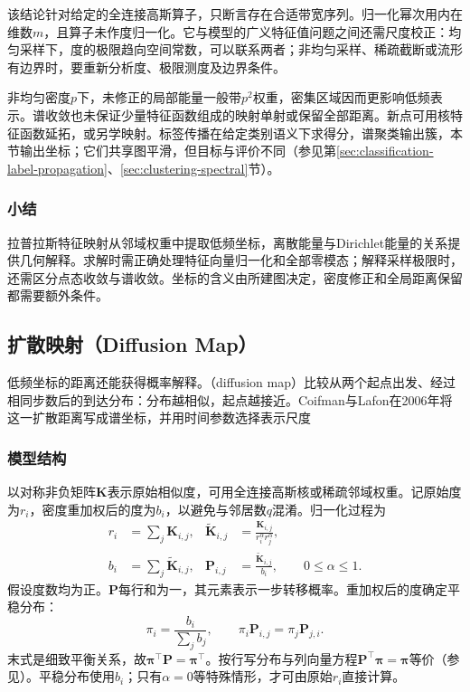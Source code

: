 该结论针对给定的全连接高斯算子，只断言存在合适带宽序列。归一化幂次用内在维数$m$，且算子未作度归一化。它与模型的广义特征值问题之间还需尺度校正：均匀采样下，度的极限趋向空间常数，可以联系两者；非均匀采样、稀疏截断或流形有边界时，要重新分析度、极限测度及边界条件。

非均匀密度$p$下，未修正的局部能量一般带$p^2$权重，密集区域因而更影响低频表示。谱收敛也未保证少量特征函数组成的映射单射或保留全部距离。新点可用核特征函数延拓，或另学映射。标签传播在给定类别语义下求得分，谱聚类输出簇，本节输出坐标；它们共享图平滑，但目标与评价不同（参见第\ref{sec:classification-label-propagation}、\ref{sec:clustering-spectral}节）。

\subsubsection{小结}

拉普拉斯特征映射从邻域权重中提取低频坐标，离散能量与Dirichlet能量的关系提供几何解释。求解时需正确处理特征向量归一化和全部零模态；解释采样极限时，还需区分点态收敛与谱收敛。坐标的含义由所建图决定，密度修正和全局距离保留都需要额外条件。

\subsection{扩散映射（Diffusion Map）}
\label{sec:dim-diffusion}

低频坐标的距离还能获得概率解释。（diffusion map）比较从两个起点出发、经过相同步数后的到达分布：分布越相似，起点越接近。Coifman与Lafon在2006年将这一扩散距离写成谱坐标，并用时间参数选择表示尺度

\subsubsection{模型结构}

以对称非负矩阵$\bm{K}$表示原始相似度，可用全连接高斯核或稀疏邻域权重。记原始度为$r_i$，密度重加权后的度为$b_i$，以避免与邻居数$q$混淆。归一化过程为
\begin{equation}
  \label{eq:dim-diffusion-normalization}
  \begin{aligned}
    r_i&=\sum_j\bm{K}_{i,j},&
    \widetilde{\bm{K}}_{i,j}
      &=\frac{\bm{K}_{i,j}}{r_i^\alpha r_j^\alpha},\\
    b_i&=\sum_j\widetilde{\bm{K}}_{i,j},&
    \bm{P}_{i,j}&=\frac{\widetilde{\bm{K}}_{i,j}}{b_i},
    \qquad 0\leq\alpha\leq1.
  \end{aligned}
\end{equation}
假设度数均为正。$\bm{P}$每行和为一，其元素表示一步转移概率。重加权后的度确定平稳分布：
\begin{equation}
  \label{eq:dim-diffusion-stationary}
  \pi_i=\frac{b_i}{\sum_j b_j},
  \qquad
  \pi_i\bm{P}_{i,j}=\pi_j\bm{P}_{j,i}.
\end{equation}
末式是细致平衡关系，故$\bm{\pi}^{\top}\bm{P}=\bm{\pi}^{\top}$。按行写分布与列向量方程$\bm P^\top\bm\pi=\bm\pi$等价（参见）。平稳分布使用$b_i$；只有$\alpha=0$等特殊情形，才可由原始$r_i$直接计算。

